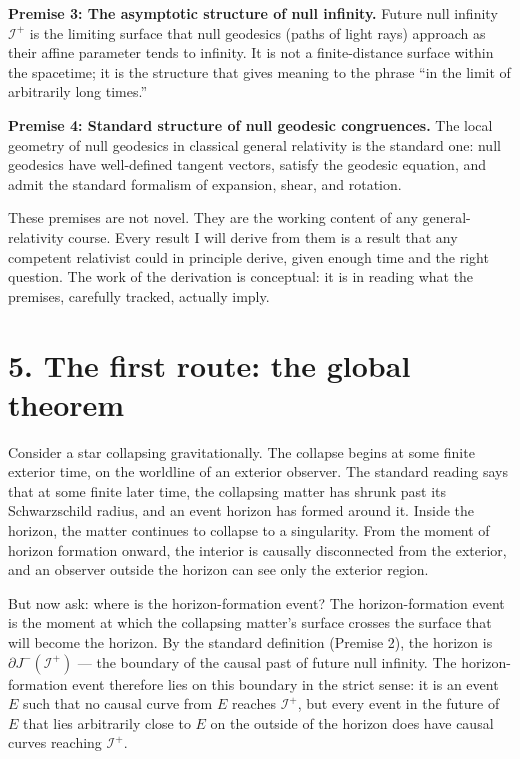 \documentclass[11pt,a4paper]{article}
\begin{document}
\textbf{Premise 3: The asymptotic structure of null infinity.} Future null infinity $\mathscr{I}^+$ is the limiting surface that null geodesics (paths of light rays) approach as their affine parameter tends to infinity. It is not a finite-distance surface within the spacetime; it is the structure that gives meaning to the phrase ``in the limit of arbitrarily long times.''

\textbf{Premise 4: Standard structure of null geodesic congruences.} The local geometry of null geodesics in classical general relativity is the standard one: null geodesics have well-defined tangent vectors, satisfy the geodesic equation, and admit the standard formalism of expansion, shear, and rotation.

These premises are not novel. They are the working content of any general-relativity course. Every result I will derive from them is a result that any competent relativist could in principle derive, given enough time and the right question. The work of the derivation is conceptual: it is in reading what the premises, carefully tracked, actually imply.

\section*{5. The first route: the global theorem}

Consider a star collapsing gravitationally. The collapse begins at some finite exterior time, on the worldline of an exterior observer. The standard reading says that at some finite later time, the collapsing matter has shrunk past its Schwarzschild radius, and an event horizon has formed around it. Inside the horizon, the matter continues to collapse to a singularity. From the moment of horizon formation onward, the interior is causally disconnected from the exterior, and an observer outside the horizon can see only the exterior region.

But now ask: where is the horizon-formation event? The horizon-formation event is the moment at which the collapsing matter's surface crosses the surface that will become the horizon. By the standard definition (Premise 2), the horizon is $\partial J^-(\mathscr{I}^+)$ --- the boundary of the causal past of future null infinity. The horizon-formation event therefore lies on this boundary in the strict sense: it is an event $E$ such that no causal curve from $E$ reaches $\mathscr{I}^+$, but every event in the future of $E$ that lies arbitrarily close to $E$ on the outside of the horizon does have causal curves reaching $\mathscr{I}^+$.
\end{document}
